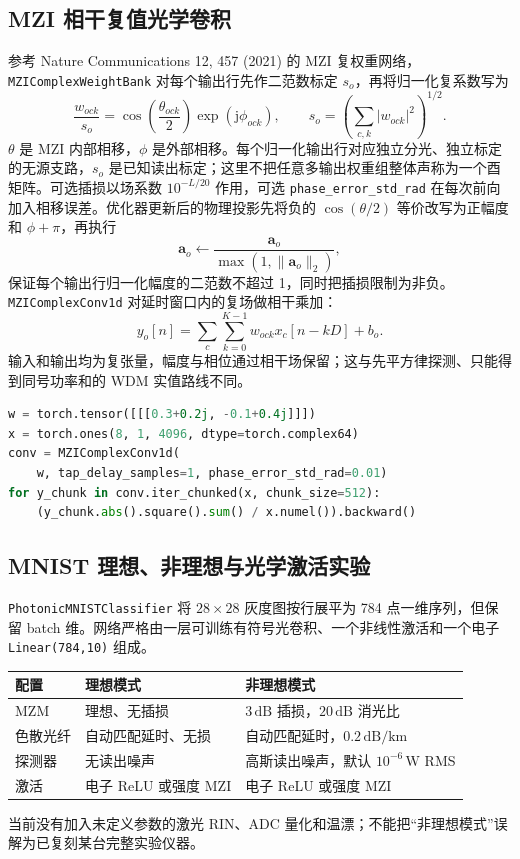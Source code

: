 \documentclass[11pt,a4paper,UTF8]{ctexart}
\newcommand{\pkg}[1]{\texttt{#1}}
\begin{document}
\subsection{MZI 相干复值光学卷积}
参考 Nature Communications 12, 457 (2021) 的 MZI 复权重网络，\pkg{MZIComplexWeightBank} 对每个输出行先作二范数标定 $s_o$，再将归一化复系数写为
\begin{equation}
\frac{w_{ock}}{s_o}=\cos\!\left(\frac{\theta_{ock}}{2}\right)
\exp(\mathrm{j}\phi_{ock}),\qquad
s_o=\left(\sum_{c,k}|w_{ock}|^2\right)^{1/2}.
\end{equation}
$\theta$ 是 MZI 内部相移，$\phi$ 是外部相移。每个归一化输出行对应独立分光、独立标定的无源支路，$s_o$ 是已知读出标定；这里不把任意多输出权重组整体声称为一个酉矩阵。可选插损以场系数 $10^{-L/20}$ 作用，可选 \pkg{phase\_error\_std\_rad} 在每次前向加入相移误差。优化器更新后的物理投影先将负的 $\cos(\theta/2)$ 等价改写为正幅度和 $\phi+\pi$，再执行
\begin{equation}
\bm a_o\leftarrow\frac{\bm a_o}{\max(1,\lVert\bm a_o\rVert_2)},
\end{equation}
保证每个输出行归一化幅度的二范数不超过 1，同时把插损限制为非负。\pkg{MZIComplexConv1d} 对延时窗口内的复场做相干乘加：
\begin{equation}
y_o[n]=\sum_c\sum_{k=0}^{K-1}w_{ock}x_c[n-kD]+b_o.
\end{equation}
输入和输出均为复张量，幅度与相位通过相干场保留；这与先平方律探测、只能得到同号功率和的 WDM 实值路线不同。

\begin{lstlisting}[language=Python]
w = torch.tensor([[[0.3+0.2j, -0.1+0.4j]]])
x = torch.ones(8, 1, 4096, dtype=torch.complex64)
conv = MZIComplexConv1d(
    w, tap_delay_samples=1, phase_error_std_rad=0.01)
for y_chunk in conv.iter_chunked(x, chunk_size=512):
    (y_chunk.abs().square().sum() / x.numel()).backward()
\end{lstlisting}

\subsection{MNIST 理想、非理想与光学激活实验}
\pkg{PhotonicMNISTClassifier} 将 $28\times28$ 灰度图按行展平为 784 点一维序列，但保留 batch 维。网络严格由一层可训练有符号光卷积、一个非线性激活和一个电子 \pkg{Linear(784,10)} 组成。

\begin{longtable}{L{38mm}L{53mm}L{58mm}}
\toprule
\textbf{配置} & \textbf{理想模式} & \textbf{非理想模式}\\
\midrule
MZM & 理想、无插损 & $3\,\mathrm{dB}$ 插损，$20\,\mathrm{dB}$ 消光比\\
色散光纤 & 自动匹配延时、无损 & 自动匹配延时，$0.2\,\mathrm{dB/km}$\\
探测器 & 无读出噪声 & 高斯读出噪声，默认 $10^{-6}\,\mathrm W$ RMS\\
激活 & 电子 ReLU 或强度 MZI & 电子 ReLU 或强度 MZI\\
\bottomrule
\end{longtable}
当前没有加入未定义参数的激光 RIN、ADC 量化和温漂；不能把“非理想模式”误解为已复刻某台完整实验仪器。
\end{document}
